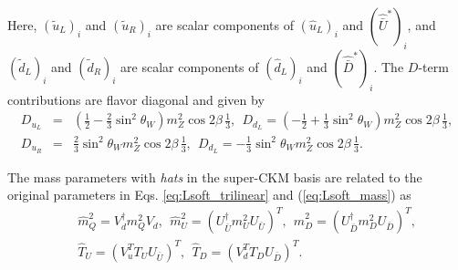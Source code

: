 \documentclass[preprint,3p,12pt]{elsarticle}
\begin{document}
{ Here, $(\tilde u_L)_i$ and $(\tilde u_R)_i$ are scalar components of $(\hat u_L)_i$ and $(\hat{\bar U}^*)_i$, and 
 $(\tilde d_L)_i$ and $(\tilde d_R)_i$ are scalar components of $(\hat d_L)_i$ and $(\hat{\bar D}^*)_i$. The $D$-term contributions are flavor diagonal and given by
\begin{eqnarray}
D_{u_L} &=& (\frac{1}{2} - \frac{2}{3} \sin^2\theta_W) m_Z^2 \cos2 \beta \, \frac{1}{3}, \ \
D_{d_L} = (-\frac{1}{2} + \frac{1}{3} \sin^2\theta_W) m_Z^2 \cos2 \beta \, \frac{1}{3}, \nonumber \\
D_{u_R}&=& \frac{2}{3} \sin^2\theta_W m_Z^2 \cos2 \beta \, \frac{1}{3}, \ \ 
D_{d_L} =  -\frac{1}{3} \sin^2\theta_W m_Z^2 \cos2 \beta \, \frac{1}{3}.
\end{eqnarray}

 The mass parameters with {\it hats} in the super-CKM basis are related to the original parameters in Eqs. \eqref{eq:Lsoft_trilinear} and (\ref{eq:Lsoft_mass}) as
 \begin{eqnarray}
&& \hat m_{Q}^2 = V_{d}^\dag m_{Q}^2 V_d, \ \ \hat m_U^2  = (U_{\bar U}^\dag m_{U}^2 U_{\bar U})^T, 
\ \ \hat m_D^2  = (U_{\bar D}^\dag m_{D}^2 U_{\bar D})^T, \nonumber \\
&& \hat T_U = (V_u^T T_U U_{\bar U})^T, \ \ 
\hat T_D = (V_d^T T_D U_{\bar D})^T.
\end{eqnarray}



}
\end{document}
